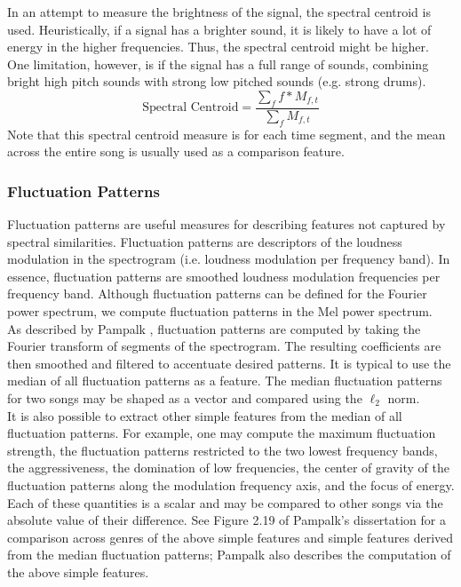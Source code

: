 \documentclass[12pt]{article}
\begin{document}
In an attempt to measure the brightness of the signal, the spectral centroid is used.  Heuristically, if a signal has a brighter sound, it is likely to have a lot of energy in the higher frequencies.  Thus, the spectral centroid might be higher.  One limitation, however, is if the signal has a full range of sounds, combining bright high pitch sounds with strong low pitched sounds (e.g. strong drums).
$$ \text{Spectral Centroid} = \frac{\sum_f f*M_{f,t}}{\sum_f M_{f,t}} $$
Note that this spectral centroid measure is for each time segment, and the mean across the entire song is usually used as a comparison feature.

\subsubsection{Fluctuation Patterns}

Fluctuation patterns are useful measures for describing features not captured by spectral similarities.  Fluctuation patterns are descriptors of the loudness modulation in the spectrogram (i.e. loudness modulation per frequency band).  In essence, fluctuation patterns are smoothed loudness modulation frequencies per frequency band.  Although fluctuation patterns can be defined for the Fourier power spectrum, we compute fluctuation patterns in the Mel power spectrum.\\

As described by Pampalk \cite{pampalk:dissertation}, fluctuation patterns are computed by taking the Fourier transform of segments of the spectrogram.  The resulting coefficients are then smoothed and filtered to accentuate desired patterns.  It is typical to use the median of all fluctuation patterns as a feature.  The median fluctuation patterns for two songs may be shaped as a vector and compared using the $\ell_2$ norm.\\

It is also possible to extract other simple features from the median of all fluctuation patterns.  For example, one may compute the maximum fluctuation strength, the fluctuation patterns restricted to the two lowest frequency bands, the aggressiveness, the domination of low frequencies, the center of gravity of the fluctuation patterns along the modulation frequency axis, and the focus of energy.  Each of these quantities is a scalar and may be compared to other songs via the absolute value of their difference.  See Figure 2.19 of Pampalk's dissertation \cite{pampalk:dissertation} for a comparison across genres of the above simple features and simple features derived from the median fluctuation patterns; Pampalk also describes the computation of the above simple features.\\
\end{document}
